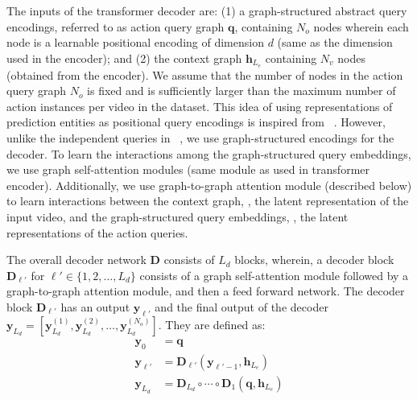 \documentclass[10pt,twocolumn,letterpaper]{article}
\begin{document}
The inputs of the transformer decoder are: (1) a graph-structured abstract query encodings, referred to as action query graph $\mathbf{q}$, containing $N_o$ nodes wherein each node is a learnable positional encoding of dimension $d$ (same as the dimension used in the encoder); and (2) the context graph $\mathbf{h}_{L_e}$ containing $N_v$ nodes (obtained from the encoder). 
We assume that the number of nodes in the action query graph $N_o$ is fixed and is sufficiently larger than the maximum number of action instances per video in the dataset. This idea of using representations of prediction entities as positional query encodings is inspired from ~\cite{carion2020end}. However, unlike the independent queries in ~\cite{carion2020end}, we use graph-structured encodings for the decoder.
To learn the interactions among the graph-structured query embeddings, we use graph self-attention modules (same module as used in transformer encoder). Additionally, we use graph-to-graph attention module (described below) to learn interactions between the context graph, \ie, the latent representation of the input video, and the graph-structured query embeddings, \ie, the latent representations of the action queries.




The overall decoder network $\mathbf{D}$ consists of $L_d$ blocks, wherein, a decoder block $\mathbf{D}_{\ell'}$ for $\ell' \in \{1,2,\ldots,L_{d}\}$ consists of a graph self-attention module followed by a graph-to-graph attention module, and then a feed forward network. The decoder block $\mathbf{D}_{\ell'}$ has an output $\mathbf{y}_{\ell'}$ and the final output of the decoder $\mathbf{y}_{L_d} = [\mathbf{y}^{(1)}_{L_d}, \mathbf{y}^{(2)}_{L_d}, \ldots, \mathbf{y}^{(N_o)}_{L_d}]$. They are defined as:
\begin{equation}
\label{eq:dec}
\begin{split}
    \mathbf{y}_{0} &= \mathbf{q}\\
    \mathbf{y}_{\ell'} &= \mathbf{D}_{\ell'}(\mathbf{y}_{\ell'-1},\mathbf{h}_{L_e}) \\
    \mathbf{y}_{L_d} &= \mathbf{D}_{L_{d}} \circ \cdots \circ \mathbf{D}_{1} (\mathbf{q},\mathbf{h}_{L_{e}})
\end{split}
\end{equation}
\end{document}
